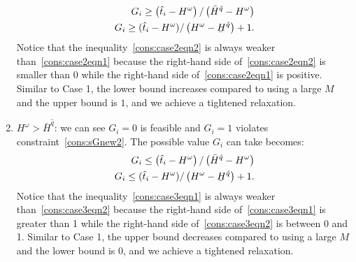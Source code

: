 \documentclass[11pt]{article}
\renewcommand{\underbar}{\underaccent{\bar}}
\begin{document}
\begin{enumerate}
			\begin{subequations}
				\begin{align}
				G_i \geq \left(\hat{t}_i - H^\omega \right)/\left( \bar{H}^{\hat{q}} - H^\omega \right) \label{cons:case2eqn1}\\
				G_i \geq (\hat{t}_i - H^\omega)/\left(H^\omega - \underbar{H}^{\hat{q}} \right) + 1. \label{cons:case2eqn2}
				\end{align}
			\end{subequations}
			Notice that the inequality~\eqref{cons:case2eqn2} is always weaker than~\eqref{cons:case2eqn1} because the right-hand side of~\eqref{cons:case2eqn2} is smaller than 0 while the right-hand side of~\eqref{cons:case2eqn1} is positive. Similar to Case 1, the lower bound increases compared to using a large \(M\) and the upper bound is \(1\), and we achieve a tightened relaxation.
		\item 
			\(H^\omega > \bar{H}^{\hat{q}}\): 
			we can see \(G_i = 0\) is feasible and \(G_i = 1\) violates constraint~\eqref{cons:sGnew2}. The possible value \(G_i\) can take becomes:
			\begin{subequations}
				\begin{align}
				G_i \leq \left(\hat{t}_i - H^\omega \right)/\left( \bar{H}^{\hat{q}} - H^\omega \right) \label{cons:case3eqn1}\\
				G_i \leq (\hat{t}_i - H^\omega)/\left(H^\omega - \underbar{H}^{\hat{q}} \right) + 1. \label{cons:case3eqn2}
				\end{align}
			\end{subequations}
			Notice that the inequality~\eqref{cons:case3eqn1} is always weaker than~\eqref{cons:case3eqn2} because the right-hand side of~\eqref{cons:case3eqn1} is greater than 1 while the right-hand side of~\eqref{cons:case3eqn2} is between 0 and 1. Similar to Case 1, the upper bound decreases compared to using a large \(M\) and the lower bound is \(0\), and we achieve a tightened relaxation.
	\end{enumerate}
\end{document}
